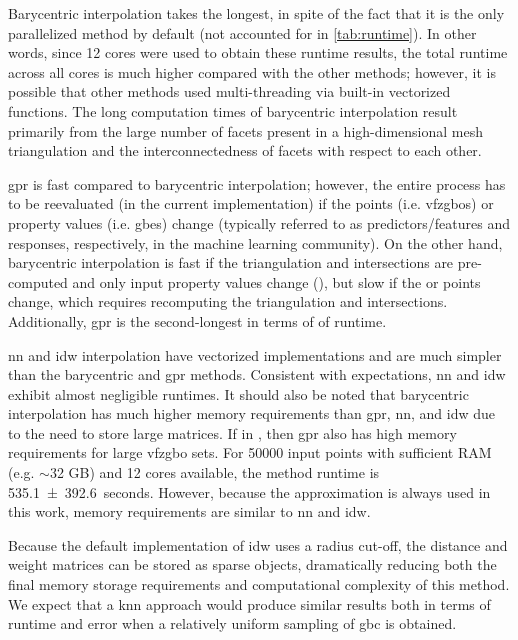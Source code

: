 \documentclass[final,twocolumn,12pt]{elsarticle}
\begin{document}
Barycentric interpolation takes the longest, in spite of the fact that it is the only parallelized method by default (not accounted for in \cref{tab:runtime}). In other words, since 12 cores were used to obtain these runtime results, the total runtime across all cores is much higher compared with the other methods; however, it is possible that other methods used multi-threading via built-in vectorized functions. The long computation times of barycentric interpolation result primarily from the large number of facets present in a high-dimensional mesh triangulation and the interconnectedness of facets with respect to each other.

\Gls{gpr} is fast compared to barycentric interpolation; however, the entire process has to be reevaluated (in the current implementation) if the \inpt{} points (i.e. \glspl{vfzgbo}) or \inpt{} property values (i.e. \glspl{gbe}) change
(typically referred to as predictors/features and responses, respectively, in the machine learning community).
On the other hand, barycentric interpolation is fast if the triangulation and intersections are pre-computed and only input property values change (), but slow if the \inpt{} or \outpt{} points change, which requires recomputing the triangulation and intersections. Additionally, \gls{gpr} is the second-longest in terms of of runtime. %

\Gls{nn} and \gls{idw} interpolation have vectorized implementations and are much simpler than the barycentric and \gls{gpr} methods. Consistent with expectations, \gls{nn} and \gls{idw} exhibit almost negligible runtimes. %
It should also be noted that barycentric interpolation has much higher memory requirements than \gls{gpr}, \gls{nn}, and \gls{idw} due to the need to store large matrices. If  in , then \gls{gpr} also has high memory requirements for large \gls{vfzgbo} sets. For \num{50000} input points with sufficient RAM (e.g. $\sim$32 GB) and 12 cores available, the  method runtime is \SI{535.1 \pm 392.6}{seconds}. However, because the  approximation is always used in this work, memory requirements are similar to \gls{nn} and \gls{idw}.

Because the default implementation of \gls{idw} uses a radius cut-off, the distance and weight matrices can be stored as sparse objects, dramatically reducing both the final memory storage requirements and computational complexity of this method. We expect that a \gls{knn} approach would produce similar results both in terms of runtime and error when a relatively uniform sampling of \gls{gbc} is obtained.
\end{document}
